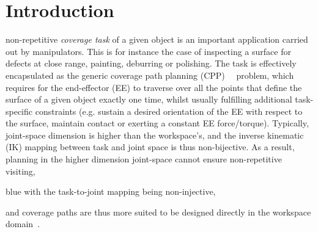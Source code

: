 \documentclass[journal]{IEEEtran}
\begin{document}
\section{Introduction}
% 
% 
% 
% 
 non-repetitive \textit{coverage task} of a given object is an important application carried out by manipulators.
This is for instance the case of inspecting a surface for defects at close range, painting, deburring or polishing. 
The task is effectively encapsulated as the generic coverage path planning (CPP)~\cite{choset2001coverage}~\cite{galceran2013a} problem, which requires for the end-effector (EE) to traverse over all the points that define the surface of a given object exactly one time, whilst usually 
fulfilling additional task-specific constraints (e.g.  sustain a desired orientation of the EE with respect to the surface, maintain contact or exerting a constant EE force/torque). 
Typically, joint-space dimension is higher than the workspace's, %
and the inverse kinematic (IK) mapping between task and joint space is thus non-bijective.  
As a result, planning in the higher dimension joint-space cannot ensure non-repetitive visiting, 
\begin{color}{blue}
with the task-to-joint mapping being non-injective, 
\end{color}
and coverage paths are thus more suited to be designed directly in the workspace domain~\cite{Oriolo2005Motion}.  
\end{document}
